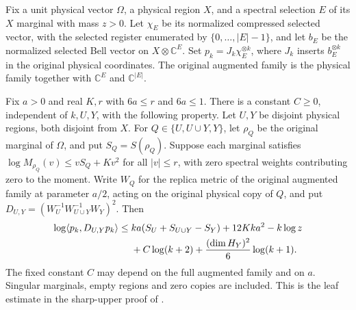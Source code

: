 \begin{theorem}
    \label{thm:replica_pinned_sharp_leaf}
    \leanok
    Fix a unit physical vector $\Omega$, a physical region $X$, and a
    spectral selection $E$ of its $X$ marginal with mass $z>0$.
    Let $\chi_E$ be its normalized compressed selected vector, with the
    selected register enumerated by $\{0,\ldots,|E|-1\}$, and let $b_E$
    be the normalized selected Bell vector on $X\otimes\mathbb C^E$.
    Set $p_k=J_k\chi_E^{\otimes k}$, where $J_k$ inserts $b_E^{\otimes k}$
    in the original physical coordinates. The original augmented family
    is the physical family together with $\mathbb C^E$ and
    $\mathbb C^{|E|}$.

    Fix $a>0$ and real $K,r$ with $6a\leq r$ and $6a\leq1$.
    There is a constant $C\geq0$, independent of $k,U,Y$, with the
    following property. Let $U,Y$ be disjoint physical regions, both
    disjoint from $X$. For $Q\in\{U,U\cup Y,Y\}$, let $\rho_Q$ be the
    original marginal of $\Omega$, and put $S_Q=S(\rho_Q)$. Suppose
    each marginal satisfies
    $\log M_{\rho_Q}(v)\leq vS_Q+Kv^2$ for all $|v|\leq r$,
    with zero spectral weights contributing zero to the moment.
    Write $W_Q$ for the replica metric of the original augmented family
    at parameter $a/2$, acting on the original physical copy of $Q$, and
    put $D_{U,Y}=(W_U^{-1}W_{U\cup Y}^{-1}W_Y)^2$.
    Then
    \begin{align}
        \log\langle p_k,D_{U,Y}p_k\rangle
        \leq{}&ka(S_U+S_{U\cup Y}-S_Y)+12Kka^2-k\log z\notag\\
        &+C\log(k+2)+\frac{(\dim H_Y)^2}{6}\log(k+1).
        \label{eq:pinned_sharp_leaf_rate}
    \end{align}
    The fixed constant $C$ may depend on the full augmented family and
    on $a$. Singular marginals, empty regions and zero copies are included.
    This is the leaf estimate in the sharp-upper proof of
    \cite[Section~8]{OpenAI2026AreaLaw}.
\end{theorem}
